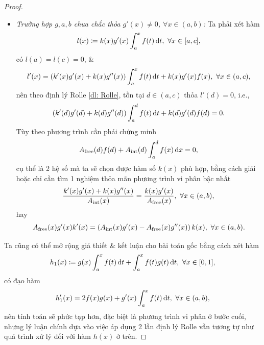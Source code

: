 \documentclass{article}
\begin{document}
\begin{proof}
\begin{itemize}
\begin{equation*}
		\end{equation*}
		Tùy theo phương trình cần phải chứng minh
		\begin{equation*}
			A_{\rm free}(d)f(d) + A_{\rm int}(d)\int_a^d f(x)\,{\rm d}x = 0,
		\end{equation*}
		cụ thể là 2 hệ số mà ta sẽ chọn được hàm số $k(x)$ phù hợp, bằng cách giải hoặc chỉ cần tìm 1 nghiệm thỏa mãn phương trình vi phân bậc nhất
		\begin{equation*}
			\frac{k'(x)}{A_{\rm int}(x)} = \frac{k(x)}{A_{\rm free}(x)},
		\end{equation*}
		hay
		\begin{equation*}
			A_{\rm free}(x)k'(x) = A_{\rm int}(x)k(x),\ \forall x\in(a,b).
		\end{equation*}
		\item {\it Trường hợp $g,a,b$ chưa chắc thỏa $g'(x)\ne0$, $\forall x\in(a,b)$:} Ta phải xét hàm
		\begin{equation*}
			l(x)\coloneqq k(x)g'(x)\int_a^x f(t)\,{\rm d}t,\ \forall x\in[a,c],
		\end{equation*}
		có $l(a) = l(c) = 0$, \&
		\begin{equation*}
			l'(x) = (k'(x)g'(x) + k(x)g''(x))\int_a^x f(t)\,{\rm d}t + k(x)g'(x)f(x),\ \forall x\in(a,c),
		\end{equation*}
		nên theo định lý Rolle \ref{dl: Rolle}, tồn tại $d\in(a,c)$ thỏa $l'(d) = 0$, i.e.,
		\begin{equation*}
			(k'(d)g'(d) + k(d)g''(d))\int_a^d f(t)\,{\rm d}t + k(d)g'(d)f(d) = 0.
		\end{equation*}
		Tùy theo phương trình cần phải chứng minh
		\begin{equation*}
			A_{\rm free}(d)f(d) + A_{\rm int}(d)\int_a^d f(x)\,{\rm d}x = 0,
		\end{equation*}
		cụ thể là 2 hệ số mà ta sẽ chọn được hàm số $k(x)$ phù hợp, bằng cách giải hoặc chỉ cần tìm 1 nghiệm thỏa mãn phương trình vi phân bậc nhất
		\begin{equation*}
			\frac{k'(x)g'(x) + k(x)g''(x)}{A_{\rm int}(x)} = \frac{k(x)g'(x)}{A_{\rm free}(x)},\ \forall x\in(a,b),
		\end{equation*}
		hay
		\begin{equation*}
			A_{\rm free}(x)g'(x)k'(x) = \left(A_{\rm int}(x)g'(x) - A_{\rm free}(x)g''(x)\right)k(x),\ \forall x\in(a,b).
		\end{equation*}
	\end{itemize}
	Ta cũng có thể mở rộng giả thiết \& kết luận cho bài toán gốc bằng cách xét hàm
	\begin{align*}
		h_1(x)\coloneqq g(x)\int_a^x f(t)\,{\rm d}t + \int_a^x f(t)g(t)\,{\rm d}t,\ \forall x\in[0,1],
	\end{align*}
	có đạo hàm
	\begin{equation*}
		h_1'(x) = 2f(x)g(x) + g'(x)\int_a^x f(t)\,{\rm d}t,\ \forall x\in(a,b),
	\end{equation*}
	nên tính toán sẽ phức tạp hơn, đặc biệt là phương trình vi phân ở bước cuối, nhưng lý luận chính dựa vào việc áp dụng 2 lần định lý Rolle vẫn tương tự như quá trình xử lý đối với hàm $h(x)$ ở trên.
\end{proof}
\end{document}
